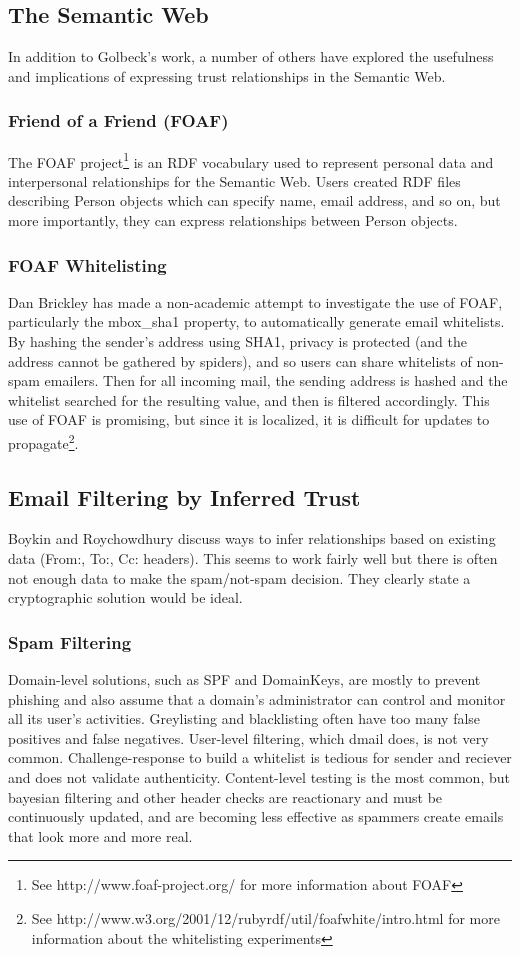 \documentclass{acm_proc_article-sp}
\begin{document}
\subsection{The Semantic Web}
In addition to Golbeck's work, a number of others have explored the usefulness and implications of expressing trust relationships in the Semantic Web.

\subsubsection{Friend of a Friend (FOAF)}
The FOAF project\footnote{See http://www.foaf-project.org/ for more information about FOAF} is an RDF vocabulary used to represent personal data and interpersonal relationships for the Semantic Web.  Users created RDF files describing Person objects which can specify name, email address, and so on, but more importantly, they can express relationships between Person objects.  

\subsubsection{FOAF Whitelisting}
Dan Brickley has made a non-academic attempt to investigate the use of FOAF, particularly the mbox\_sha1 property, to automatically generate email whitelists. By hashing the sender's address using SHA1, privacy is protected (and the address cannot be gathered by spiders), and so users can share whitelists of non-spam emailers. Then for all incoming mail, the sending address is hashed and the whitelist searched for the resulting value, and then is filtered accordingly. This use of FOAF is promising, but since it is localized, it is difficult for updates to propagate\footnote{See http://www.w3.org/2001/12/rubyrdf/util/foafwhite/intro.html for more information about the whitelisting experiments}.

\subsection{Email Filtering by Inferred Trust}
Boykin and Roychowdhury discuss ways to infer relationships based on existing data (From:, To:, Cc: headers)\cite{boykin04email}. This seems to work fairly well but there is often not enough data to make the spam/not-spam decision. They clearly state a cryptographic solution would be ideal.

\subsubsection{Spam Filtering}
Domain-level solutions, such as SPF and DomainKeys, are mostly to prevent phishing and also assume that a domain's administrator can control and monitor all its user's activities. Greylisting and blacklisting often have too many false positives and false negatives. User-level filtering, which dmail does, is not very common. Challenge-response to build a whitelist is tedious for sender and reciever and does not validate authenticity. Content-level testing is the most common, but bayesian filtering and other header checks are reactionary and must be continuously updated, and are becoming less effective as spammers create emails that look more and more real. 
\end{document}
